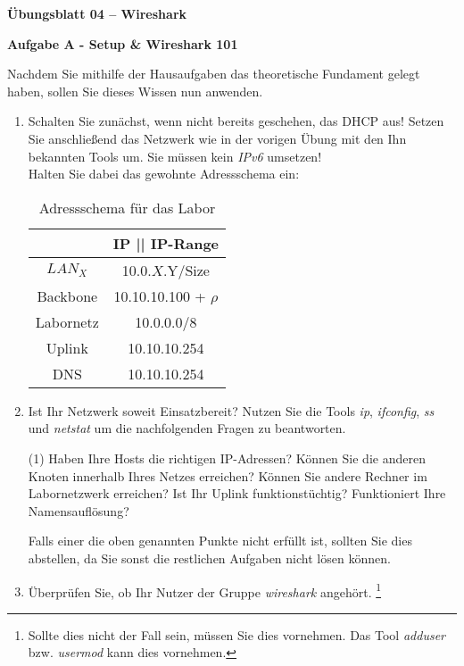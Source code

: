 \documentclass[paper=a4,fontsize=11pt]{scrartcl}%
\begin{document}
\begin{center}
\Large{\textbf{Übungsblatt 04 -- Wireshark}}\\
\end{center}

\begin{center}
\Large{\textbf{Aufgabe A - Setup \& Wireshark 101}}
\end{center}\vskip0.25in
Nachdem Sie mithilfe der Hausaufgaben das theoretische Fundament gelegt haben, sollen Sie dieses Wissen nun anwenden.
\begin{enumerate}
	\item Schalten Sie zunächst, wenn nicht bereits geschehen, das DHCP aus! Setzen Sie anschließend das Netzwerk wie in der vorigen Übung mit den Ihn bekannten Tools um. Sie müssen kein \emph{IPv6} umsetzen!\\
	Halten Sie dabei das gewohnte Adressschema ein:
\begin{table}[H]
\caption{Adressschema für das Labor}
\label{adress_scheme}
\centering
\begin{tabular}{|c|c|}\hline
 & \textbf{IP  || IP-Range} \\ \hline
 $LAN_X$ & 10.0.$X$.Y/Size \\ \hline
 Backbone & 10.10.10.100 + $\rho$ \\ \hline
 Labornetz & 10.0.0.0/8 \\ \hline
 Uplink & 10.10.10.254 \\ \hline
 DNS & 10.10.10.254 \\ \hline
\end{tabular}
\end{table} 
	\item Ist Ihr Netzwerk soweit Einsatzbereit? Nutzen Sie die Tools \emph{ip}, \emph{ifconfig}, \emph{ss} und \emph{netstat} um die nachfolgenden Fragen zu beantworten.
	\begin{tasks}(1)
		\task Haben Ihre Hosts die richtigen IP-Adressen?
		\task Können Sie die anderen Knoten innerhalb Ihres Netzes erreichen?
		\task Können Sie andere Rechner im Labornetzwerk erreichen?
		\task Ist Ihr Uplink funktionstüchtig?
		\task Funktioniert Ihre Namensauflösung?
	\end{tasks}
	Falls einer die oben genannten Punkte nicht erfüllt ist, sollten Sie dies abstellen, da Sie sonst die restlichen Aufgaben nicht lösen können.
	\item Überprüfen Sie, ob Ihr Nutzer der Gruppe \emph{wireshark} angehört. \footnote{Sollte dies nicht der Fall sein, müssen Sie dies vornehmen. Das Tool \emph{adduser} bzw. \emph{usermod} kann dies vornehmen.}

\end{enumerate}
\end{document}
